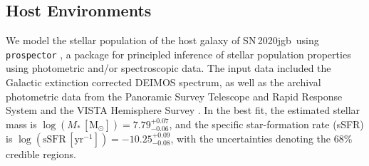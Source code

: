 \documentclass[twocolumn]{aastex631}
\newcommand{\sn}{SN\,2020jgb}
\begin{document}
{\subsection{Host Environments} \label{sec:host}
We model the stellar population of the host galaxy of \sn\ using \texttt{prospector} \citep{Johnson_prospector_2021}, a package for principled inference of stellar population properties using photometric and/or spectroscopic data. The input data included the Galactic extinction corrected DEIMOS spectrum, as well as the archival photometric data from the Panoramic Survey Telescope and Rapid Response System \citep[Pan-STARRS;][{\it r, i, z} Kron magnitudes]{PS1_2016}  and the VISTA Hemisphere Survey \citep[VHS;][J and $\mathrm{K}_\mathrm{s}$ Petrosian magnitudes]{VHS_2013}. In the best fit, the estimated stellar mass is $\log (M_*\,[\mathrm{M_\odot}])=7.79_{-0.06}^{+0.07}$, and the specific star-formation rate (sSFR) is $\log (\mathrm{sSFR}\,[\mathrm{yr}^{-1}])=-10.25_{-0.08}^{+0.09}$, with the uncertainties denoting the 68\% credible regions.

}
\end{document}
